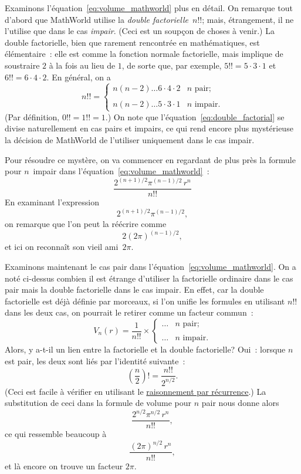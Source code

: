 Examinons l'équation~\eqref{eq:volume_mathworld} plus en détail. On
remarque tout d'abord que MathWorld utilise la
\emph{double factorielle}~$n!!$\ns; mais, étrangement, il ne l'utilise que dans le
cas \emph{impair}. (Ceci est un soupçon de choses à venir.) La double
factorielle, bien que rarement rencontrée en mathématiques, est élémentaire~:
elle est comme la fonction normale factorielle, mais implique de soustraire $2$
à la fois au lieu de $1$, de sorte que, par exemple, $5!! = 5 \cdot 3 \cdot 1$
et $6!! = 6 \cdot 4 \cdot 2$. En général, on a
\begin{equation}
\label{eq:double_factorial}
n!! = \begin{cases}
n(n-2)\ldots6\cdot4\cdot2 & n \text{ pair}; \\ \\
n(n-2)\ldots5\cdot3\cdot1 & n \text{ impair}.
\end{cases}
\end{equation}
(Par définition, $0!! =1!! = 1$.) On note que
l'équation~\eqref{eq:double_factorial} se divise naturellement en cas pairs et
impairs, ce qui rend encore plus mystérieuse la décision de MathWorld de
l'utiliser uniquement dans le cas impair.

Pour résoudre ce mystère, on va commencer en regardant de plus près la formule
pour $n$~impair dans l'équation~\eqref{eq:volume_mathworld}~:
\[ \frac{2^{(n+1)/2}\pi^{(n-1)/2}\,r^n}{n!!} \]
En examinant l'expression
\[ 2^{(n+1)/2}\pi^{(n-1)/2}, \]
on remarque que l'on peut la réécrire comme
\[ 2(2\pi)^{(n-1)/2}, \]
et ici on reconnaît son vieil ami~$2\pi$.

Examinons maintenant le cas pair dans
l'équation~\eqref{eq:volume_mathworld}. On a noté ci-dessus combien il est
étrange d'utiliser la factorielle ordinaire dans le cas pair mais la double
factorielle dans le cas impair. En effet, car la double factorielle est déjà
définie par morceaux, si l'on unifie les formules en utilisant $n!!$ dans les
deux cas, on pourrait le retirer comme un facteur commun~:
\[
V_n(r) = \frac{1}{n!!}\times \begin{cases}
\ldots & n \text{ pair}; \\ \\
 \ldots & n \text{ impair}.
 \end{cases}
\]
Alors, y a-t-il un lien entre la factorielle et la double factorielle\ns?
Oui~: lorsque $n$ est pair, les deux sont liés par l'identité suivante~:
\[ \left(\frac{n}{2}\right)! = \frac{n!!}{2^{n/2}}. \]
(Ceci est facile à vérifier en utilisant le
\href{https://fr.wikipedia.org/wiki/Raisonnement_par_récurrence}{raisonnement
par récurrence}.) La substitution de ceci dans la formule de volume pour $n$
pair nous donne alors
\[ \frac{2^{n/2}\pi^{n/2}\,r^n}{n!!}, \]
ce qui ressemble beaucoup à
\[ \frac{(2\pi)^{n/2}\,r^n}{n!!}, \]
et là encore on trouve un facteur $2\pi$.

